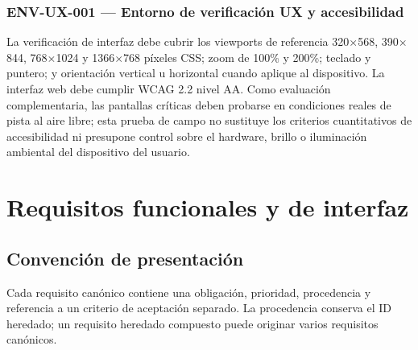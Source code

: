 \documentclass[10pt,letterpaper]{article}
\begin{document}
\subsubsection{ENV-UX-001 --- Entorno de verificación UX y accesibilidad}
La verificación de interfaz debe cubrir los viewports de referencia 320$\times$568, 390$\times$844, 768$\times$1024 y 1366$\times$768 píxeles CSS; zoom de 100\% y 200\%; teclado y puntero; y orientación vertical u horizontal cuando aplique al dispositivo. La interfaz web debe cumplir WCAG 2.2 nivel AA. Como evaluación complementaria, las pantallas críticas deben probarse en condiciones reales de pista al aire libre; esta prueba de campo no sustituye los criterios cuantitativos de accesibilidad ni presupone control sobre el hardware, brillo o iluminación ambiental del dispositivo del usuario.

\section{Requisitos funcionales y de interfaz}
\subsection{Convención de presentación}
Cada requisito canónico contiene una obligación, prioridad, procedencia y referencia a un criterio de aceptación separado. La procedencia conserva el ID heredado; un requisito heredado compuesto puede originar varios requisitos canónicos.
\end{document}
